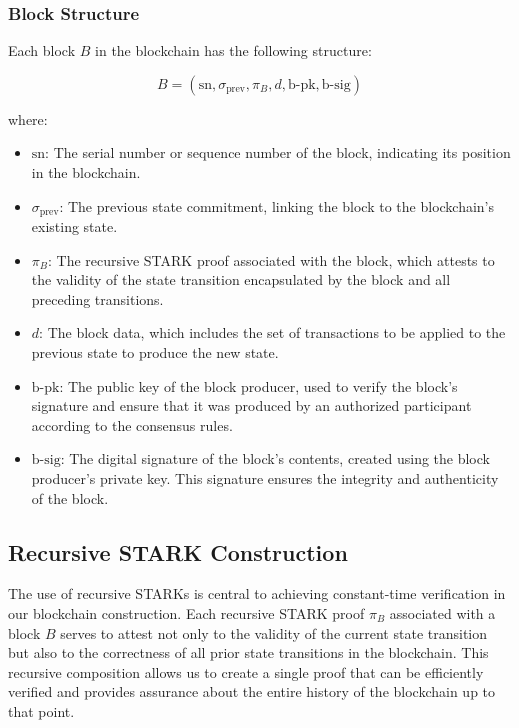 \documentclass{article}
\theoremstyle{plain}
\theoremstyle{definition}
\theoremstyle{remark}
\theoremstyle{problem}
\begin{document}
\subsubsection{Block Structure}

Each block $B$ in the blockchain has the following structure:

\[
B = (\text{sn}, \sigma_{\text{prev}}, \pi_B, d, \text{b-pk}, \text{b-sig})
\]

where:

\begin{itemize}
    \item $\text{sn}$: The serial number or sequence number of the block, indicating its position in the blockchain.

    \item $\sigma_{\text{prev}}$: The previous state commitment, linking the block to the blockchain's existing state.

    \item $\pi_B$: The recursive STARK proof associated with the block, which attests to the validity of the state transition encapsulated by the block and all preceding transitions.

    \item $d$: The block data, which includes the set of transactions to be applied to the previous state to produce the new state.

    \item $\text{b-pk}$: The public key of the block producer, used to verify the block's signature and ensure that it was produced by an authorized participant according to the consensus rules.

    \item $\text{b-sig}$: The digital signature of the block's contents, created using the block producer's private key. This signature ensures the integrity and authenticity of the block.
\end{itemize}

\subsection{Recursive STARK Construction}

The use of recursive STARKs is central to achieving constant-time verification in our blockchain construction. Each recursive STARK proof $\pi_B$ associated with a block $B$ serves to attest not only to the validity of the current state transition but also to the correctness of all prior state transitions in the blockchain. This recursive composition allows us to create a single proof that can be efficiently verified and provides assurance about the entire history of the blockchain up to that point.
\end{document}
